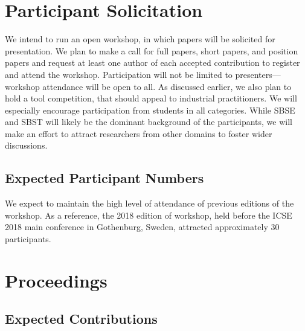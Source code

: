 \documentclass[10pt,conference]{IEEEtran}
\begin{document}
\section{Participant Solicitation}

We intend to run an open workshop, in which papers will be solicited
for presentation.  We plan to make a call for full papers, short
papers, and position papers and request at least one author of each
accepted contribution to register and attend the workshop.
Participation will not be limited to presenters---workshop attendance
will be open to all. As discussed earlier, we also plan to hold a tool
competition, that should appeal to industrial practitioners. We will
especially encourage participation from students in all
categories. While SBSE and SBST will likely be the dominant background
of the participants, we will make an effort to attract researchers
from other domains to foster wider discussions.

\subsection{Expected Participant Numbers}
\label{sec:expectedparticipants}


We expect to maintain the high level of attendance of previous
editions of the workshop. As a reference, the 2018 edition of
workshop, held before the ICSE 2018 main conference in Gothenburg,
Sweden, attracted approximately 30 participants.

\section{Proceedings}

\subsection{Expected Contributions}
\end{document}
